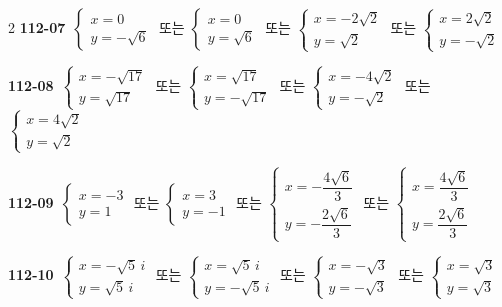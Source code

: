 \documentclass[10pt,a4paper]{article}
\begin{document}
\begin{multicols}{2}
\noindent\textbf{112-07}\ $\begin{cases} x=0 \\ y=-\sqrt{6} \end{cases}$ 또는 $\begin{cases} x=0 \\ y=\sqrt{6} \end{cases}$ 또는 $\begin{cases} x=-2\sqrt{2} \\ y=\sqrt{2} \end{cases}$ 또는 $\begin{cases} x=2\sqrt{2} \\ y=-\sqrt{2} \end{cases}$\par
\noindent\textbf{112-08}\ $\begin{cases} x=-\sqrt{17} \\ y=\sqrt{17} \end{cases}$ 또는 $\begin{cases} x=\sqrt{17} \\ y=-\sqrt{17} \end{cases}$ 또는 $\begin{cases} x=-4\sqrt{2} \\ y=-\sqrt{2} \end{cases}$ 또는 $\begin{cases} x=4\sqrt{2} \\ y=\sqrt{2} \end{cases}$\par
\noindent\textbf{112-09}\ $\begin{cases} x=-3 \\ y=1 \end{cases}$ 또는 $\begin{cases} x=3 \\ y=-1 \end{cases}$ 또는 $\begin{cases} x=-\dfrac{4\sqrt{6}}{3} \\[2mm] y=-\dfrac{2\sqrt{6}}{3} \end{cases}$ 또는 $\begin{cases} x=\dfrac{4\sqrt{6}}{3} \\[2mm] y=\dfrac{2\sqrt{6}}{3} \end{cases}$\par
\noindent\textbf{112-10}\ $\begin{cases} x=-\sqrt{5}\,i \\ y=\sqrt{5}\,i \end{cases}$ 또는 $\begin{cases} x=\sqrt{5}\,i \\ y=-\sqrt{5}\,i \end{cases}$ 또는 $\begin{cases} x=-\sqrt{3} \\ y=-\sqrt{3} \end{cases}$ 또는 $\begin{cases} x=\sqrt{3} \\ y=\sqrt{3} \end{cases}$\par

\end{multicols}
\end{document}
